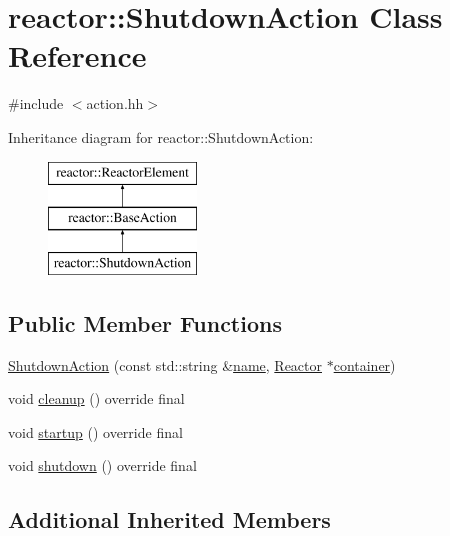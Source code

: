 \hypertarget{classreactor_1_1ShutdownAction}{}\section{reactor\+:\+:Shutdown\+Action Class Reference}
\label{classreactor_1_1ShutdownAction}


{\ttfamily \#include $<$action.\+hh$>$}

Inheritance diagram for reactor\+:\+:Shutdown\+Action\+:\begin{figure}[H]
\begin{center}
\leavevmode
\includegraphics[height=3.000000cm]{classreactor_1_1ShutdownAction}
\end{center}
\end{figure}
\subsection*{Public Member Functions}
\begin{DoxyCompactItemize}
\item 
\hyperlink{classreactor_1_1ShutdownAction_a9b0444bd81eaca6f1b51f484ee0b95b2}{Shutdown\+Action} (const std\+::string \&\hyperlink{classreactor_1_1ReactorElement_a99579f61dbaf5d5d98aebfe26eb8bf77}{name}, \hyperlink{classreactor_1_1Reactor}{Reactor} $\ast$\hyperlink{classreactor_1_1ReactorElement_a25bf298de879a82eefc1ba426be05812}{container})
\item 
void \hyperlink{classreactor_1_1ShutdownAction_acbea47c7b7efb26cd10d6ac8c781901a}{cleanup} () override final
\item 
void \hyperlink{classreactor_1_1ShutdownAction_a21c23857012b384cd06f55e002291824}{startup} () override final
\item 
void \hyperlink{classreactor_1_1ShutdownAction_a8950ffd9b67f4800b75a95af92c4fd2a}{shutdown} () override final
\end{DoxyCompactItemize}
\subsection*{Additional Inherited Members}


